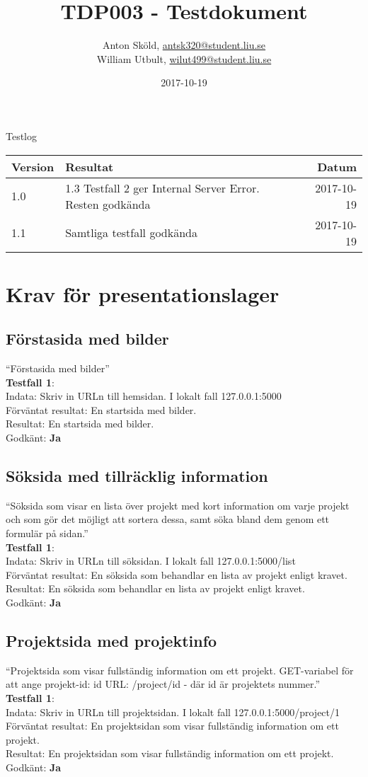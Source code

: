 \documentclass{TDP003mall}
\author{Anton Sköld, \url{antsk320@student.liu.se}\\
  William Utbult, \url{wilut499@student.liu.se}}
\title{TDP003 - Testdokument}
\date{2017-10-19}
\begin{document}
\projectpage
\tableofcontents

\begin{center}
Testlog\\
  \begin{tabular}{ |l|l|r| }
    \hline
    Version & Resultat & Datum\\
    \hline\hline
    1.0 & 1.3 Testfall 2 ger Internal Server Error. Resten godkända & 2017-10-19\\\hline
    1.1 & Samtliga testfall godkända & 2017-10-19\\\hline
  \end{tabular}
\end{center}

\section{Krav för presentationslager}
\subsection{Förstasida med bilder}
“Förstasida med bilder”\\
\textbf{Testfall 1}:\\
Indata: Skriv in URLn till hemsidan. I lokalt fall 127.0.0.1:5000\\
Förväntat resultat: En startsida med bilder.\\
Resultat: En startsida med bilder.\\
Godkänt: \textbf{Ja}

\subsection{Söksida med tillräcklig information}
“Söksida som visar en lista över projekt med kort information om varje projekt och som gör det möjligt att sortera dessa, samt söka bland dem genom ett formulär på sidan.”\\
\textbf{Testfall 1}: \\
Indata: Skriv in URLn till söksidan. I lokalt fall 127.0.0.1:5000/list\\
Förväntat resultat: En söksida som behandlar en lista av projekt enligt kravet.\\
Resultat: En söksida som behandlar en lista av projekt enligt kravet.\\
Godkänt: \textbf{Ja}

\subsection{Projektsida med projektinfo}
“Projektsida som visar fullständig information om ett projekt. GET-variabel
för att ange projekt-id: id URL: /project/id - där id är projektets
nummer.”\\
\textbf{Testfall 1}: \\
Indata: Skriv in URLn till projektsidan. I lokalt fall 127.0.0.1:5000/project/1\\
Förväntat resultat: En projektsidan som visar fullständig information om ett projekt.\\
Resultat: En projektsidan som visar fullständig information om ett projekt.\\
Godkänt: \textbf{Ja}
\end{document}
